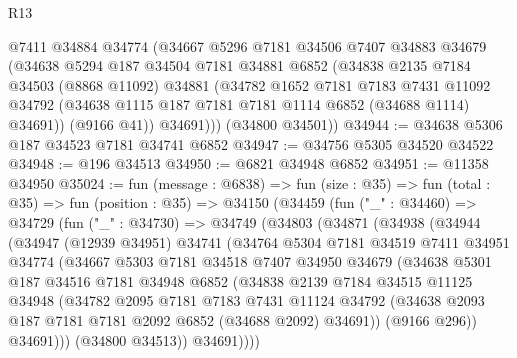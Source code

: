 \begin{lexlean}{R13}
\begin{coremodule}
        @7411
        @34884
        @34774
        (@34667
          @5296
          @7181
          @34506
          @7407
          @34883
          @34679
          (@34638
            @5294
            @187
            @34504
            @7181
            @34881
            @6852
            (@34838
              @2135
              @7184
              @34503
              (@8868 @11092)
              @34881
              (@34782
                @1652
                @7181
                @7183
                @7431
                @11092
                @34792
                (@34638 @1115 @187 @7181 @7181 @1114 @6852 (@34688 @1114) @34691))
              (@9166 @41))
            @34691)))
      (@34800 @34501))
@34944 := @34638 @5306 @187 @34523 @7181 @34741 @6852
@34947 := @34756 @5305 @34520 @34522
@34948 := @196 @34513
@34950 := @6821 @34948 @6852
@34951 := @11358 @34950
@35024 := fun (message : @6838) =>
  fun (size : @35) =>
  fun (total : @35) =>
  fun (position : @35) =>
  @34150
    (@34459
      (fun ("_" : @34460) =>
      @34729
        (fun ("_" : @34730) =>
        @34749
          (@34803
            (@34871
              (@34938
                (@34944
                  (@34947
                    (@12939 @34951)
                    @34741
                    (@34764
                      @5304
                      @7181
                      @34519
                      @7411
                      @34951
                      @34774
                      (@34667
                        @5303
                        @7181
                        @34518
                        @7407
                        @34950
                        @34679
                        (@34638
                          @5301
                          @187
                          @34516
                          @7181
                          @34948
                          @6852
                          (@34838
                            @2139
                            @7184
                            @34515
                            @11125
                            @34948
                            (@34782
                              @2095
                              @7181
                              @7183
                              @7431
                              @11124
                              @34792
                              (@34638 @2093 @187 @7181 @7181 @2092 @6852 (@34688 @2092) @34691))
                            (@9166 @296))
                          @34691)))
                    (@34800 @34513))
                  @34691))))

\end{coremodule}
\end{lexlean}
